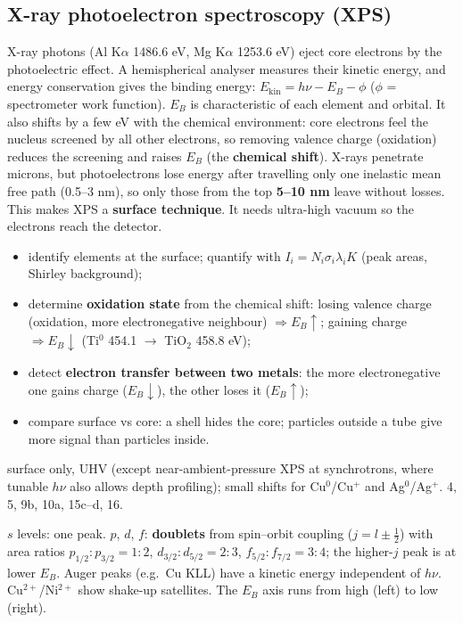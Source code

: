 \subsection{X-ray photoelectron spectroscopy (XPS)}
{X-ray photons (Al K$\alpha$ 1486.6 eV, Mg K$\alpha$ 1253.6 eV) eject core electrons by the photoelectric effect. A hemispherical
analyser measures their kinetic energy, and energy conservation gives the binding energy:
$E_\mathrm{kin} = h\nu - E_B - \phi$ ($\phi$ = spectrometer work function). $E_B$ is characteristic of each element and orbital.
It also shifts by a few eV with the chemical environment: core electrons feel the nucleus screened by all other electrons, so
removing valence charge (oxidation) reduces the screening and raises $E_B$ (the \textbf{chemical shift}). X-rays penetrate microns,
but photoelectrons lose energy after travelling only one inelastic mean free path (0.5--3 nm), so only those from the top
\textbf{5--10 nm} leave without losses. This makes XPS a \textbf{surface technique}. It needs ultra-high vacuum so the electrons
reach the detector.}
{\begin{itemize}
 \item identify elements at the surface; quantify with $I_i = N_i\sigma_i\lambda_iK$ (peak areas, Shirley background);
 \item determine \textbf{oxidation state} from the chemical shift: losing valence charge (oxidation, more electronegative
       neighbour) $\Rightarrow E_B\uparrow$; gaining charge $\Rightarrow E_B\downarrow$ (Ti$^0$ 454.1 $\to$ TiO$_2$ 458.8 eV);
 \item detect \textbf{electron transfer between two metals}: the more electronegative one gains charge ($E_B\downarrow$), the other
       loses it ($E_B\uparrow$);
 \item compare surface vs core: a shell hides the core; particles outside a tube give more signal than particles inside.
\end{itemize}}
{surface only, UHV (except near-ambient-pressure XPS at synchrotrons, where tunable $h\nu$ also allows depth profiling); small
shifts for Cu$^0$/Cu$^+$ and Ag$^0$/Ag$^+$.}
{4, 5, 9b, 10a, 15c--d, 16.}
\begin{keybox}
$s$ levels: one peak. $p$, $d$, $f$: \textbf{doublets} from spin--orbit coupling ($j = l\pm\frac12$) with area ratios
$p_{1/2}:p_{3/2}=1:2$, $d_{3/2}:d_{5/2}=2:3$, $f_{5/2}:f_{7/2}=3:4$; the higher-$j$ peak is at lower $E_B$. Auger peaks (e.g.\ Cu KLL)
have a kinetic energy independent of $h\nu$. Cu$^{2+}$/Ni$^{2+}$ show shake-up satellites\extra. The $E_B$ axis runs from high (left)
to low (right).
\end{keybox}

